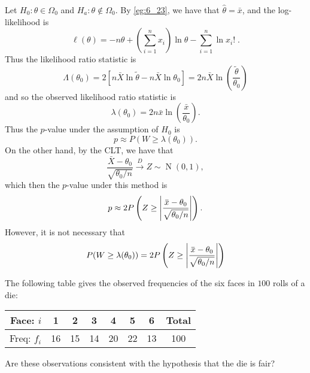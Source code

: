 \documentclass[notoc,notitlepage]{tufte-book}
\DeclareMathOperator{\Nor}{N }
\newcommand{\convd}{\overset{D}{\to}}
\begin{document}
\begin{solution}
  Let $H_0 : \theta \in \Omega_0$ and $H_a : \theta \notin \Omega_0$. By \cref{eg:6_23}, we have that $\hat{\theta} = \bar{x}$, and the log-likelihood is
  \begin{equation*}
    \ell(\theta) = -n\theta + \left( \sum_{i=1}^{n} x_i \right) \ln \theta - \sum_{i=1}^{n} \ln x_i! \; .
  \end{equation*}
  Thus the likelihood ratio statistic is
  \begin{equation*}
    \Lambda(\theta_0) = 2[ n\bar{X} \ln \tilde{\theta} - n \bar{X} \ln \theta_0 ] = 2n\bar{X} \ln \left( \frac{\tilde{\theta}}{\theta_0} \right)
  \end{equation*}
  and so the observed likelihood ratio statistic is
  \begin{equation*}
    \lambda(\theta_0) = 2n \bar{x} \ln \left( \frac{\bar{x}}{\theta_0} \right).
  \end{equation*}
  Thus the $p$-value under the assumption of $H_0$ is
  \begin{equation*}
    p \approx P(W \geq \lambda(\theta_0)).
  \end{equation*}
  On the other hand, by the CLT, we have that
  \begin{equation*}
    \frac{\bar{X} - \theta_0}{\sqrt{ \theta_0 / n }} \convd Z \sim \Nor(0, 1), \end{equation*}
  which then the $p$-value under this method is
  \begin{equation*}
    p \approx 2 P\left(Z \geq \abs{\frac{\bar{x} - \theta_0}{\sqrt{\theta_0 / n}}}\right).
  \end{equation*}
  However, it is not necessary that
  \begin{equation*}
    P(W \geq \lambda(\theta_0)) = 2 P\left(Z \geq \abs{\frac{\bar{x} - \theta_0}{\sqrt{\theta_0 / n}}}\right)
  \end{equation*}
\end{solution}

\begin{eg}
  The following table gives the observed frequencies of the six faces in $100$ rolls of a die:

  \begin{center}
  \begin{tabular}{r | c | c | c | c | c | c | c}
  Face: $i$   & 1  & 2  & 3  & 4  & 5  & 6  & Total \\
  \hline
  Freq: $f_i$ & 16 & 15 & 14 & 20 & 22 & 13 & 100
  \end{tabular}
  \end{center}

  Are these observations consistent with the hypothesis that the die is fair?
\end{eg}
\end{document}
